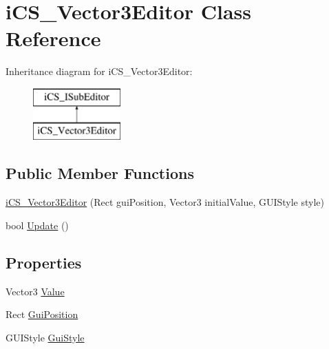 \hypertarget{classi_c_s___vector3_editor}{\section{i\+C\+S\+\_\+\+Vector3\+Editor Class Reference}
\label{classi_c_s___vector3_editor}
}
Inheritance diagram for i\+C\+S\+\_\+\+Vector3\+Editor\+:\begin{figure}[H]
\begin{center}
\leavevmode
\includegraphics[height=2.000000cm]{classi_c_s___vector3_editor}
\end{center}
\end{figure}
\subsection*{Public Member Functions}
\begin{DoxyCompactItemize}
\item 
\hyperlink{classi_c_s___vector3_editor_a2971db16f8c42f65e168f53e680fa546}{i\+C\+S\+\_\+\+Vector3\+Editor} (Rect gui\+Position, Vector3 initial\+Value, G\+U\+I\+Style style)
\item 
bool \hyperlink{classi_c_s___vector3_editor_a7836bdfcff3316fc2997bd14f6b91914}{Update} ()
\end{DoxyCompactItemize}
\subsection*{Properties}
\begin{DoxyCompactItemize}
\item 
Vector3 \hyperlink{classi_c_s___vector3_editor_a259546dec6cf7de34fa55d31fb1cd755}{Value}
\item 
Rect \hyperlink{classi_c_s___vector3_editor_a3435eb3c93efdc71d3742dafa4d7f825}{Gui\+Position}
\item 
G\+U\+I\+Style \hyperlink{classi_c_s___vector3_editor_a24112a1ea2e2ef287be2bb447a80512a}{Gui\+Style}
\end{DoxyCompactItemize}



